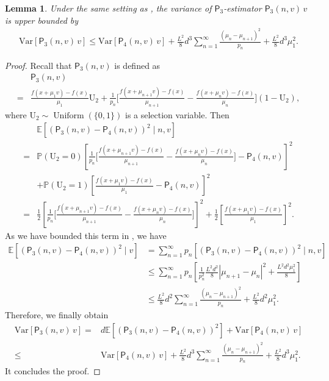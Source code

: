 \documentclass{article}
\newcommand{\Var}{\mathrm{Var}}
\newcommand{\EE}{\mathbb{E}}
\newcommand{\PP}{\mathbb{P}}
\theoremstyle{definition}
\theoremstyle{plain}
\newtheorem{lemma}[definition]{Lemma}
\theoremstyle{remark}
\newcommand{\sfP}{\mathsf{P}}
\begin{document}
\begin{lemma}\label{lemma:variance-p3}
    Under the same setting as , the variance of $\sfP_3$-estimator $\mathsf P_3(n,v)\,v$ is upper bounded by
\begin{align*}
        \Var[\sfP_3(n,v) \, v ]  
 \leq \Var[\sfP_4(n,v)\, v] + \frac{L^2}{8}  d^3\sum_{n=1}^\infty \frac{(\mu_n - \mu_{n+1})^2}{p_n} + \frac{L^2 }{8} d^3\mu_1^2.
\end{align*} 
\end{lemma}
\begin{proof}
Recall that $\mathsf{P}_3(n,v)$ is defined as 
\begin{align*}
&\mathsf{P}_3(n, v)\\
= &\frac{f(x+\mu_1 v)-f(x)}{\mu_1}\mathrm{U}_2 + \frac{1}{p_n}\Biggl[ \frac{f(x+\mu_{n+1} v)-f(x)}{\mu_{n+1}} - \frac{f(x+\mu_n v)-f(x)}{\mu_n} \Biggr](1-\mathrm{U}_2),
\end{align*}
where $\mathrm{U}_2\sim  \operatorname{Uniform}\left( \{ 0, 1 \}\right)$ is a selection variable. Then 
\begin{align*}
    &\EE[ (\mathsf{P}_3(n, v) - \mathsf{P}_4(n, v))^2\mid n,v] \\
    = &\PP(\mathrm{U}_2=0) \left[ \frac{1}{p_n}\Biggl[ \frac{f(x+\mu_{n+1} v)-f(x)}{\mu_{n+1}} - \frac{f(x+\mu_n v)-f(x)}{\mu_n} \Biggr] - \mathsf{P}_4(n, v)\right]^2\\ 
    &+ \PP(\mathrm{U}_2=1)\left[\frac{f(x+\mu_1 v)-f(x)}{\mu_1}  - \mathsf{P}_4(n, v)\right]^2 \\ 
    = &\frac{1}{2} \left[ \frac{1}{p_n}\Biggl[ \frac{f(x+\mu_{n+1} v)-f(x)}{\mu_{n+1}} - \frac{f(x+\mu_n v)-f(x)}{\mu_n} \Biggr] \right]^2 + \frac{1}{2}\left[\frac{f(x+\mu_1 v)-f(x)}{\mu_1}  \right]^2 .\end{align*}
    As we have bounded this term in , we have
    \begin{align*}
        \EE[ (\mathsf{P}_3(n, v) - \mathsf{P}_4(n, v))^2\mid  v] &= \sum_{n=1}^\infty p_n [ (\mathsf{P}_3(n, v) - \mathsf{P}_4(n, v))^2\mid  n, v] \\ 
        &\leq \sum_{n=1}^\infty p_n \left[  \frac{1}{ p_n^2} \frac{L^2d^2}{8}|\mu_{n+1} - \mu_n|^2 + \frac{L^2 d^2 \mu_1^2}{8}\right]  \\
        &\leq \frac{L^2}{8}  d^2\sum_{n=1}^\infty \frac{(\mu_n - \mu_{n+1})^2}{p_n} + \frac{L^2 }{8} d^2\mu_1^2.
    \end{align*}
    Therefore, we finally obtain
\begin{align*}
    \Var[\sfP_3(n,v) \, v ]  = & d\EE[(\sfP_3(n,v)- \sfP_4(n,v))^2  ] + \Var[\sfP_4(n,v)\, v] \\ 
    \leq & \Var[\sfP_4(n,v)\, v] + \frac{L^2}{8}  d^3\sum_{n=1}^\infty \frac{(\mu_n - \mu_{n+1})^2}{p_n} + \frac{L^2 }{8} d^3\mu_1^2.
\end{align*}
It concludes the proof. 
\end{proof}
\end{document}
